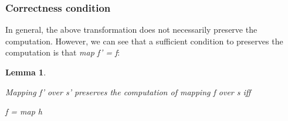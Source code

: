 \documentclass{article}
\newtheorem{lemma}{Lemma}
\begin{document}
\subsubsection{Correctness condition}

In general, the above transformation does not necessarily preserve
the computation. However, we can see that a sufficient condition to
preserves the computation is that\emph{ map f' = f}:

\begin{lemma}\label{ConditionOnReducedDim}

Mapping \emph{f'} over \emph{s'} preserves the computation of mapping
\emph{f} over \emph{s} iff 

\emph{f = map h}

\end{lemma}
\end{document}
